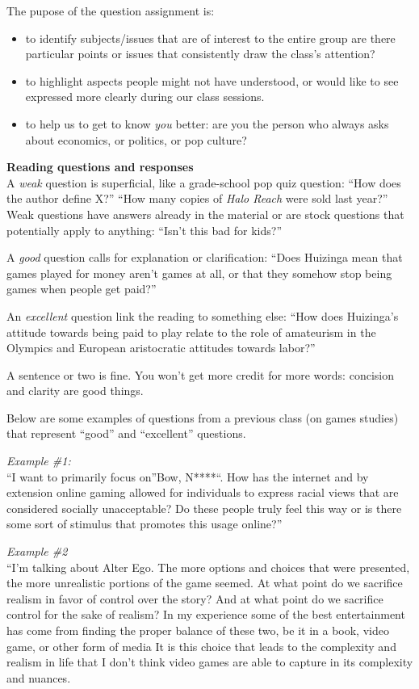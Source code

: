 \documentclass[]{tufte-handout}
\providecommand{\tightlist}{%
  \setlength{\itemsep}{0pt}\setlength{\parskip}{0pt}}
\begin{document}
The pupose of the question assignment is:

\begin{itemize}
\tightlist
\item
  to identify subjects/issues that are of interest to the entire group
  are there particular points or issues that consistently draw the
  class's attention?
\item
  to highlight aspects people might not have understood, or would like
  to see expressed more clearly during our class sessions.
\item
  to help us to get to know \emph{you} better: are you the person who
  always asks about economics, or politics, or pop culture?
\end{itemize}

\textbf{Reading questions and responses}\\
A \emph{weak} question is superficial, like a grade-school pop quiz
question: ``How does the author define X?'' ``How many copies of
\emph{Halo Reach} were sold last year?'' Weak questions have answers
already in the material or are stock questions that potentially apply to
anything: ``Isn't this bad for kids?''

A \emph{good} question calls for explanation or clarification: ``Does
Huizinga mean that games played for money aren't games at all, or that
they somehow stop being games when people get paid?''

An \emph{excellent} question link the reading to something else: ``How
does Huizinga's attitude towards being paid to play relate to the role
of amateurism in the Olympics and European aristocratic attitudes
towards labor?''

A sentence or two is fine. You won't get more credit for more words:
concision and clarity are good things.

Below are some examples of questions from a previous class (on games
studies) that represent ``good'' and ``excellent'' questions.

\emph{Example \#1:}\\
``I want to primarily focus on''Bow, N****``. How has the internet and
by extension online gaming allowed for individuals to express racial
views that are considered socially unacceptable? Do these people truly
feel this way or is there some sort of stimulus that promotes this usage
online?''

\emph{Example \#2}\\
``I'm talking about Alter Ego. The more options and choices that were
presented, the more unrealistic portions of the game seemed. At what
point do we sacrifice realism in favor of control over the story? And at
what point do we sacrifice control for the sake of realism? In my
experience some of the best entertainment has come from finding the
proper balance of these two, be it in a book, video game, or other form
of media It is this choice that leads to the complexity and realism in
life that I don't think video games are able to capture in its
complexity and nuances.
\end{document}

